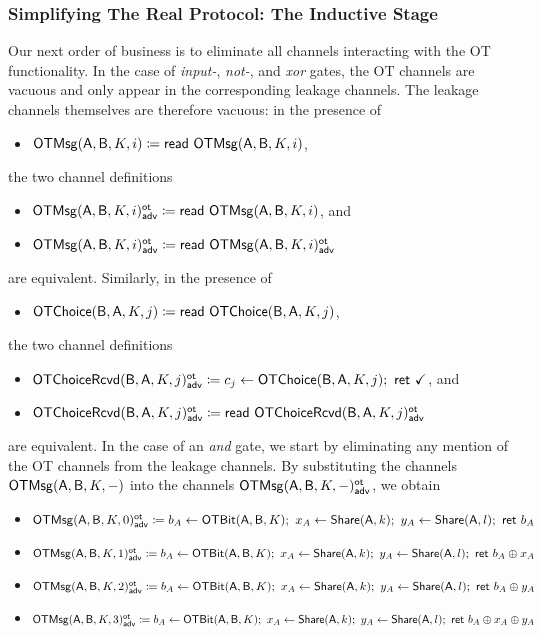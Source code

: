\subsubsection{Simplifying The Real Protocol: The Inductive Stage}
Our next order of business is to eliminate all channels interacting with the OT functionality. In the case of \emph{input-}, \emph{not-}, and \emph{xor} gates, the OT channels are vacuous and only appear in the corresponding leakage channels. The leakage channels themselves are therefore vacuous: in the presence of
\begin{itemize}
\item $\mathsf{OTMsg}(\mathsf{A},\mathsf{B},K,i) \coloneqq \mathsf{read} \ \mathsf{OTMsg}(\mathsf{A},\mathsf{B},K,i)$,
\end{itemize}
the two channel definitions
\begin{itemize}
\item $\mathsf{OTMsg}(\mathsf{A},\mathsf{B},K,i)^{\mathsf{ot}}_{\mathsf{adv}} \coloneqq \mathsf{read} \ \mathsf{OTMsg}(\mathsf{A},\mathsf{B},K,i)$, and
\item $\mathsf{OTMsg}(\mathsf{A},\mathsf{B},K,i)^{\mathsf{ot}}_{\mathsf{adv}} \coloneqq \mathsf{read} \ \mathsf{OTMsg}(\mathsf{A},\mathsf{B},K,i)^{\mathsf{ot}}_{\mathsf{adv}}$
\end{itemize}
are equivalent. Similarly, in the presence of
\begin{itemize}
\item $\mathsf{OTChoice}(\mathsf{B},\mathsf{A},K,j) \coloneqq \mathsf{read} \ \mathsf{OTChoice}(\mathsf{B},\mathsf{A},K,j)$,
\end{itemize}
the two channel definitions
\begin{itemize}
\item $\LeakOTChoiceRcvd(\B,\A,K,j)^\ot_\adv \coloneqq c_j \leftarrow \OTChoice(\B,\A,K,j); \ \ret{\checkmark}$, and
\item $\mathsf{OTChoiceRcvd}(\mathsf{B},\mathsf{A},K,j)^{\mathsf{ot}}_{\mathsf{adv}} \coloneqq \mathsf{read} \ \mathsf{OTChoiceRcvd}(\mathsf{B},\mathsf{A},K,j)^{\mathsf{ot}}_{\mathsf{adv}}$
\end{itemize}
are equivalent. In the case of an \emph{and} gate, we start by eliminating any mention of the OT channels from the leakage channels. By substituting the channels $\mathsf{OTMsg}(\mathsf{A},\mathsf{B},K,-)$ into the channels $\mathsf{OTMsg}(\mathsf{A},\mathsf{B},K,-)^{\mathsf{ot}}_{\mathsf{adv}}$, we obtain\smallskip
\begin{itemize}
\item $\mathsf{OTMsg}(\mathsf{A},\mathsf{B},K,0)^{\mathsf{ot}}_{\mathsf{adv}} \coloneqq b_A \leftarrow \mathsf{OTBit}(\mathsf{A},\mathsf{B},K); \ x_A \leftarrow \mathsf{Share}(\mathsf{A},k); \ y_A \leftarrow \mathsf{Share}(\mathsf{A},l); \ \mathsf{ret} \ b_A$
\item $\mathsf{OTMsg}(\mathsf{A},\mathsf{B},K,1)^{\mathsf{ot}}_{\mathsf{adv}} \coloneqq b_A \leftarrow \mathsf{OTBit}(\mathsf{A},\mathsf{B},K); \ x_A \leftarrow \mathsf{Share}(\mathsf{A},k); \ y_A \leftarrow \mathsf{Share}(\mathsf{A},l); \ \mathsf{ret} \ b_A \oplus x_A$
\item $\mathsf{OTMsg}(\mathsf{A},\mathsf{B},K,2)^{\mathsf{ot}}_{\mathsf{adv}} \coloneqq b_A \leftarrow \mathsf{OTBit}(\mathsf{A},\mathsf{B},K); \ x_A \leftarrow \mathsf{Share}(\mathsf{A},k); \ y_A \leftarrow \mathsf{Share}(\mathsf{A},l); \ \mathsf{ret} \ b_A \oplus y_A$
\item $\mathsf{OTMsg}(\mathsf{A},\mathsf{B},K,3)^{\mathsf{ot}}_{\mathsf{adv}} \coloneqq b_A \leftarrow \mathsf{OTBit}(\mathsf{A},\mathsf{B},K); \ x_A \leftarrow \mathsf{Share}(\mathsf{A},k); \ y_A \leftarrow \mathsf{Share}(\mathsf{A},l); \ \mathsf{ret} \ b_A \oplus x_A \oplus y_A$
\end{itemize}\smallskip
